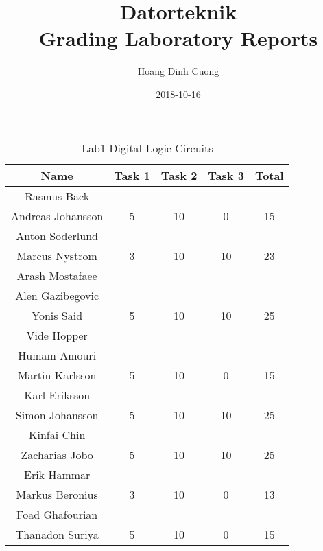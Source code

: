 \documentclass{article}
\title{Datorteknik \\ Grading Laboratory Reports}
\date{2018-10-16}
\author{Hoang Dinh Cuong}
\begin{document}
\maketitle
\newpage
{}



\begin{table}[ht]
\caption{Lab1 Digital Logic Circuits}
\centering 
\begin{tabular}{c c c c c} 
\hline\hline 
Name & Task 1 & Task 2 & Task 3 & Total \\ [0.5ex] 
\hline
Rasmus Back \\ Andreas Johansson & 5 & 10 & 0 & 15 \\
\hline 
Anton Soderlund \\ Marcus Nystrom & 3 & 10 & 10 & 23 \\
\hline 
Arash Mostafaee \\ Alen Gazibegovic \\ Yonis Said
& 5 & 10 & 10 & 25 \\
\hline 
Vide Hopper \\ Humam Amouri \\ Martin Karlsson 
& 5 & 10 & 0 & 15 \\
\hline
Karl Eriksson \\ Simon Johansson
& 5 & 10 & 10 & 25 \\ 
\hline
Kinfai Chin \\ Zacharias Jobo
& 5 & 10 & 10 & 25 \\ 
\hline
Erik Hammar \\ Markus Beronius
& 3 & 10 & 0 & 13 \\
\hline
Foad Ghafourian \\ Thanadon Suriya
& 5 & 10 & 0 & 15 \\ [1ex]
\hline
\end{tabular}
\label{table:nonlin}
\end{table}

\end{document}
